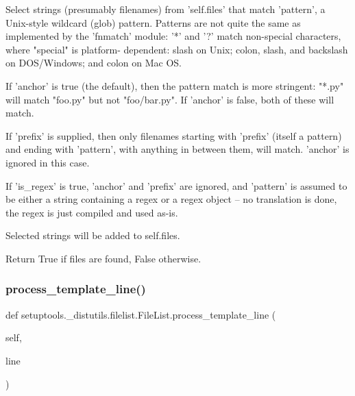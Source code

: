 \begin{DoxyVerb}Select strings (presumably filenames) from 'self.files' that
match 'pattern', a Unix-style wildcard (glob) pattern.  Patterns
are not quite the same as implemented by the 'fnmatch' module: '*'
and '?'  match non-special characters, where "special" is platform-
dependent: slash on Unix; colon, slash, and backslash on
DOS/Windows; and colon on Mac OS.

If 'anchor' is true (the default), then the pattern match is more
stringent: "*.py" will match "foo.py" but not "foo/bar.py".  If
'anchor' is false, both of these will match.

If 'prefix' is supplied, then only filenames starting with 'prefix'
(itself a pattern) and ending with 'pattern', with anything in between
them, will match.  'anchor' is ignored in this case.

If 'is_regex' is true, 'anchor' and 'prefix' are ignored, and
'pattern' is assumed to be either a string containing a regex or a
regex object -- no translation is done, the regex is just compiled
and used as-is.

Selected strings will be added to self.files.

Return True if files are found, False otherwise.
\end{DoxyVerb}
 \mbox{\label{classsetuptools_1_1__distutils_1_1filelist_1_1FileList_a9aa34753e0a1f54ab3e31035c1f9afa9}} 
\subsubsection{\texorpdfstring{process\+\_\+template\+\_\+line()}{process\_template\_line()}}
{\footnotesize\ttfamily def setuptools.\+\_\+distutils.\+filelist.\+File\+List.\+process\+\_\+template\+\_\+line (\begin{DoxyParamCaption}\item[{}]{self,  }\item[{}]{line }\end{DoxyParamCaption})}

\mbox{\label{classsetuptools_1_1__distutils_1_1filelist_1_1FileList_a834d31a5a36d8a9db6b760c4c0735e97}} 
